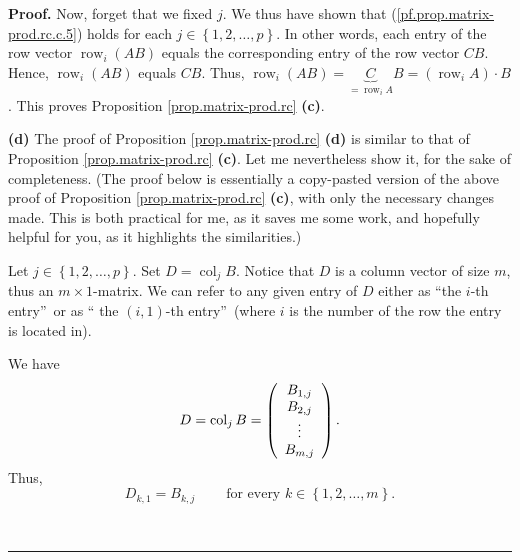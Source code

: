 \documentclass[numbers=enddot,12pt,final,onecolumn,notitlepage]{scrartcl}%
\theoremstyle{definition}
\newenvironment{proof}[1][Proof]{\noindent\textbf{#1.} }{\ \rule{0.5em}{0.5em}}
\begin{document}
\begin{proof}
Now, forget that we fixed $j$. We thus have shown that
(\ref{pf.prop.matrix-prod.rc.c.5}) holds for each $j\in\left\{  1,2,\ldots
,p\right\}  $. In other words, each entry of the row vector
$\operatorname*{row}\nolimits_{i}\left(  AB\right)  $ equals the corresponding
entry of the row vector $CB$. Hence, $\operatorname*{row}\nolimits_{i}\left(
AB\right)  $ equals $CB$. Thus, $\operatorname*{row}\nolimits_{i}\left(
AB\right)  =\underbrace{C}_{=\operatorname*{row}\nolimits_{i}A}B=\left(
\operatorname*{row}\nolimits_{i}A\right)  \cdot B$. This proves Proposition
\ref{prop.matrix-prod.rc} \textbf{(c)}.

\textbf{(d)} The proof of Proposition \ref{prop.matrix-prod.rc} \textbf{(d)}
is similar to that of Proposition \ref{prop.matrix-prod.rc} \textbf{(c)}. Let
me nevertheless show it, for the sake of completeness. (The proof below is
essentially a copy-pasted version of the above proof of Proposition
\ref{prop.matrix-prod.rc} \textbf{(c)}, with only the necessary changes made.
This is both practical for me, as it saves me some work, and hopefully helpful
for you, as it highlights the similarities.)

Let $j\in\left\{  1,2,\ldots,p\right\}  $. Set $D=\operatorname*{col}%
\nolimits_{j}B$. Notice that $D$ is a column vector of size $m$, thus an
$m\times1$-matrix. We can refer to any given entry of $D$ either as
\textquotedblleft the $i$-th entry\textquotedblright\ or as \textquotedblleft
the $\left(  i,1\right)  $-th entry\textquotedblright\ (where $i$ is the
number of the row the entry is located in).

We have%
\[
D=\operatorname*{col}\nolimits_{j}B=\left(
\begin{array}
[c]{c}%
B_{1,j}\\
B_{2,j}\\
\vdots\\
B_{m,j}%
\end{array}
\right)  .
\]
Thus,%
\begin{equation}
D_{k,1}=B_{k,j}\ \ \ \ \ \ \ \ \ \ \text{for every }k\in\left\{
1,2,\ldots,m\right\}  . \label{pf.prop.matrix-prod.rc.d.1}%
\end{equation}



\end{proof}
\end{document}
